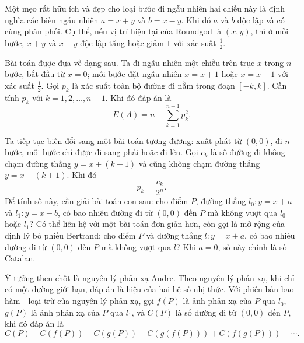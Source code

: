 \documentclass[11pt]{article}
\begin{document}
Một mẹo rất hữu ích và đẹp cho loại bước đi ngẫu nhiên hai chiều này là định
nghĩa các biến ngẫu nhiên $a=x+y$ và $b=x-y$. Khi đó $a$ và $b$ độc lập và có
cùng phân phối. Cụ thể, nếu vị trí hiện tại của Roundgod là $(x,y)$, thì ở
mỗi bước, $x+y$ và $x-y$ độc lập tăng hoặc giảm $1$ với xác suất
$\frac12$.

Bài toán được đưa về dạng sau. Ta đi ngẫu nhiên một chiều trên trục $x$ trong
$n$ bước, bắt đầu từ $x=0$; mỗi bước đặt ngẫu nhiên $x=x+1$ hoặc $x=x-1$ với
xác suất $\frac12$. Gọi $p_k$ là xác suất toàn bộ đường đi nằm trong đoạn
$[-k,k]$. Cần tính $p_k$ với $k=1,2,\ldots,n-1$. Khi đó đáp án là
\[
  E(A)=n-\sum_{k=1}^{n-1} p_k^2.
\]

Ta tiếp tục biến đổi sang một bài toán tương đương: xuất phát từ $(0,0)$,
đi $n$ bước, mỗi bước chỉ được đi sang phải hoặc đi lên. Gọi $c_k$ là số
đường đi không chạm đường thẳng $y=x+(k+1)$ và cũng không chạm đường thẳng
$y=x-(k+1)$. Khi đó
\[
  p_k=\frac{c_k}{2^n}.
\]
Để tính số này, cần giải bài toán con sau: cho điểm $P$, đường thẳng
$l_0:y=x+a$ và $l_1:y=x-b$, có bao nhiêu đường đi từ $(0,0)$ đến $P$ mà
không vượt qua $l_0$ hoặc $l_1$? Có thể liên hệ với một bài toán đơn giản
hơn, còn gọi là mở rộng của định lý bỏ phiếu Bertrand: cho điểm $P$ và đường
thẳng $l:y=x+a$, có bao nhiêu đường đi từ $(0,0)$ đến $P$ mà không vượt qua
$l$? Khi $a=0$, số này chính là số Catalan.

Ý tưởng then chốt là nguyên lý phản xạ Andre. Theo nguyên lý phản xạ, khi chỉ
có một đường giới hạn, đáp án là hiệu của hai hệ số nhị thức. Với phiên bản
bao hàm - loại trừ của nguyên lý phản xạ, gọi $f(P)$ là ảnh phản xạ của $P$
qua $l_0$, $g(P)$ là ảnh phản xạ của $P$ qua $l_1$, và $C(P)$ là số đường đi
từ $(0,0)$ đến $P$, khi đó đáp án là
\[
  C(P)-C(f(P))-C(g(P))+C(g(f(P)))+C(f(g(P)))-\cdots .
\]

\begin{center}
\end{center}
\end{document}
